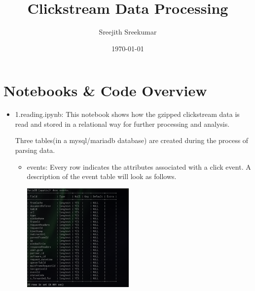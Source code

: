 \documentclass[11pt]{article}
\author{Sreejith Sreekumar}
\date{\today}
\title{Clickstream Data Processing}
\begin{document}
\maketitle
\tableofcontents





\section{Notebooks \& Code Overview}
\label{sec:orgd33134e}

\begin{itemize}
\item 1.reading.ipynb:
This notebook shows how the gzipped clickstream data is read and stored in a relational way for further processing
and analysis.

Three tables(in a mysql/mariadb database) are created during the process of parsing data.
\begin{itemize}
\item events: Every row indicates the attributes associated with a click event. A description of the event table will look as follows.

\begin{center}
\includegraphics[height=200]{imgs/events1.png}
\end{center}


\end{itemize}
\end{itemize}
\end{document}
